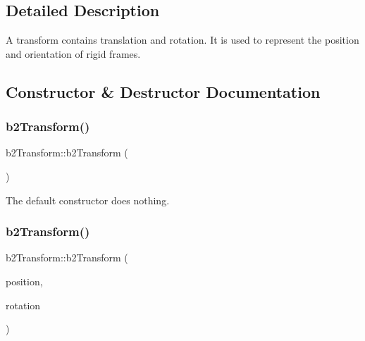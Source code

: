 \subsection{Detailed Description}
A transform contains translation and rotation. It is used to represent the position and orientation of rigid frames. 

\subsection{Constructor \& Destructor Documentation}
\mbox{\label{structb2_transform_a765a2e5c692a2e1d05c7a5441019373d}} 
\subsubsection{\texorpdfstring{b2Transform()}{b2Transform()}\hspace{0.1cm}{\footnotesize\ttfamily [1/2]}}
{\footnotesize\ttfamily b2\+Transform\+::b2\+Transform (\begin{DoxyParamCaption}{ }\end{DoxyParamCaption})\hspace{0.3cm}{\ttfamily [inline]}}



The default constructor does nothing. 

\mbox{\label{structb2_transform_a823e190e4810e35e8100f4414d0bef62}} 
\subsubsection{\texorpdfstring{b2Transform()}{b2Transform()}\hspace{0.1cm}{\footnotesize\ttfamily [2/2]}}
{\footnotesize\ttfamily b2\+Transform\+::b2\+Transform (\begin{DoxyParamCaption}\item[{const \mbox{\hyperlink{structb2_vec2}{b2\+Vec2}} \&}]{position,  }\item[{const \mbox{\hyperlink{structb2_rot}{b2\+Rot}} \&}]{rotation }\end{DoxyParamCaption})\hspace{0.3cm}{\ttfamily [inline]}}



